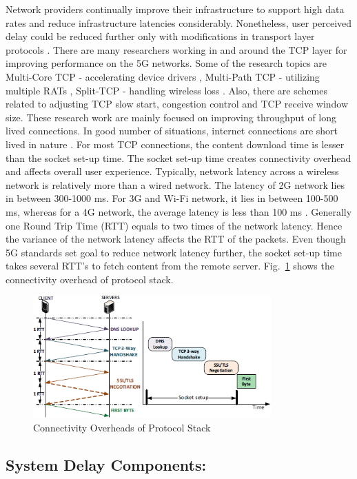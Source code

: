 \begin{multicols}{2}
Network providers continually improve their infrastructure to support high data rates and reduce infrastructure latencies considerably. Nonetheless, user perceived delay could be reduced further only with modifications in transport layer protocols \cite{art1-key07}. There are many researchers working in and around the TCP layer for improving performance on the 5G networks. Some of the research topics are Multi-Core TCP - accelerating device drivers \cite{art1-key08}, Multi-Path TCP - utilizing multiple RATs \cite{art1-key09}, Split-TCP - handling wireless loss \cite{art1-key10}. Also, there are schemes related to adjusting TCP slow start, congestion control and TCP receive window size. These research work are mainly focused on improving throughput of long lived connections. In good number of situations, internet connections are short lived in nature \cite{art1-key11}. For most TCP connections, the content download time is lesser than the socket set-up time. The socket set-up time creates connectivity overhead and affects overall user experience. Typically, network latency across a wireless network is relatively more than a wired network. The latency of 2G network lies in between 300-1000 ms. For 3G and Wi-Fi network, it lies in between 100-500 ms, whereas for a 4G network, the average latency is less than 100 ms \cite{art1-key12}. Generally one Round Trip Time (RTT) equals to two times of the network latency. Hence the variance of the network latency affects the RTT of the packets. Even though 5G standards set goal to reduce network latency further, the socket set-up time takes several RTT’s to fetch content from the remote server. Fig.~\ref{chap1-fig04} shows the connectivity overhead of protocol stack.

\begin{figure}[H]
\centering
\includegraphics[scale=0.7]{src/Figures/chap1/chap1-fig04.jpg}
\caption{Connectivity Overheads of Protocol Stack}\label{chap1-fig04}
\end{figure}

\subsection{System Delay Components:}


\end{multicols}
